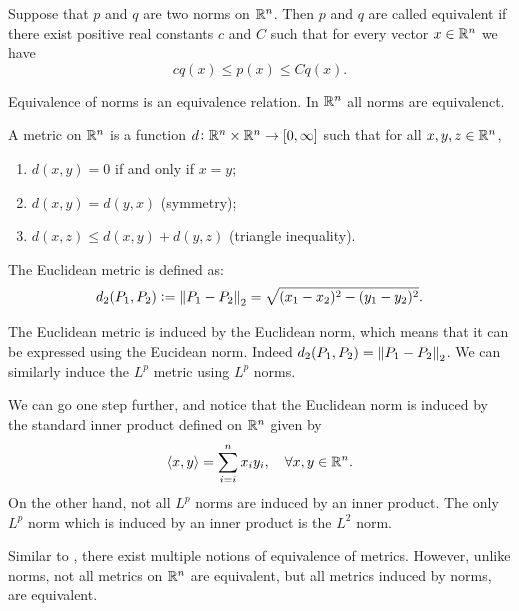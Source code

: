 \documentclass[11pt,a4paper]{article}
\begin{document}
\begin{definition}
  \label{def:equivalence-of-norms}
  Suppose that $p$ and $q$ are two norms on $\mathbb{R}^n$.
  Then $p$ and $q$ are called equivalent if there exist positive
  real constants $c$ and $C$ such that for every vector $x \in \mathbb{R}^n$
  we have
  \[
    c q(x) \le p(x) \le C q(x).
  \]
\end{definition}
\begin{remark}
  Equivalence of norms is an equivalence relation.
  In $\mathbb{R}^n$ all norms are equivalenct.
\end{remark}

\begin{definition}[Metric]
  A metric on $\mathbb{R}^n$ is a function 
  $d \colon \mathbb{R}^n \times \mathbb{R}^n \to [0,\infty]$
  such that for all $x,y,z \in \mathbb{R}^n$,
  \begin{enumerate}
    \item[(1)] $d(x,y) = 0$ if and only if $x = y$;
    \item[(2)] $d(x,y) = d(y,x)$ (symmetry);
    \item[(3)] $d(x,z) \le d(x,y) + d(y,z)$ (triangle inequality).
  \end{enumerate}
\end{definition}

\begin{definition}
  The Euclidean metric is defined as:
  \[
    d_2(P_1,P_2) := \left\lVert P_1-P_2\right\rVert_2 = \sqrt{(x_1-x_2)^2 - (y_1-y_2)^2}.
  \]
\end{definition}

\begin{remark}
  The Euclidean metric is induced by the Euclidean norm,
  which means that it can be expressed using the Eucidean norm.
  Indeed $d_2(P_1,P_2) = \left\lVert P_1-P_2\right\rVert_2$.
  We can similarly induce the $L^p$ metric using $L^p$ norms.
\end{remark}

\begin{remark}
  We can go one step further, and notice that the Euclidean
  norm is induced by the standard inner product defined on $\mathbb{R}^n$
  given by
  \[
    \left\langle x, y \right\rangle = \sum_{i=i}^{n} x_i y_i, \quad \forall x,y \in \mathbb{R}^n.
  \]
  On the other hand, not all $L^p$ norms are induced by an inner product.
  The only $L^p$ norm which is induced by an inner product is the $L^2$
  norm.
\end{remark}

\begin{remark}
  Similar to ,
  there exist multiple notions of equivalence of metrics.
  However, unlike norms, not all metrics on $\mathbb{R}^n$ are equivalent,
  but all metrics induced by norms, are equivalent.
\end{remark}
\end{document}
